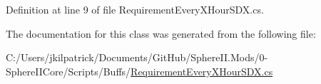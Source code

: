 Definition at line 9 of file Requirement\+Every\+X\+Hour\+S\+D\+X.\+cs.



The documentation for this class was generated from the following file\+:\begin{DoxyCompactItemize}
\item 
C\+:/\+Users/jkilpatrick/\+Documents/\+Git\+Hub/\+Sphere\+I\+I.\+Mods/0-\/\+Sphere\+I\+I\+Core/\+Scripts/\+Buffs/\mbox{\hyperlink{_requirement_every_x_hour_s_d_x_8cs}{Requirement\+Every\+X\+Hour\+S\+D\+X.\+cs}}\end{DoxyCompactItemize}
